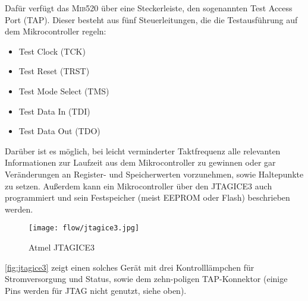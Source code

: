 Dafür verfügt das \textsc{Mib}520 über eine Steckerleiste, den sogenannten Test Access Port (TAP). Dieser besteht aus fünf Steuerleitungen, die die Testausführung auf dem Mikrocontroller regeln:
\begin{itemize}
\item Test Clock (TCK)
\item Test Reset (TRST)
\item Test Mode Select (TMS)
\item Test Data In (TDI)
\item Test Data Out (TDO)
\end{itemize}

Darüber ist es möglich, bei leicht verminderter Taktfrequenz alle relevanten Informationen zur Laufzeit aus dem Mikrocontroller zu gewinnen oder gar Veränderungen an Register- und Speicherwerten vorzunehmen, sowie Haltepunkte zu setzen. Außerdem kann ein Mikrocontroller über den JTAGICE3 auch programmiert und sein Festspeicher (meist EEPROM oder Flash) beschrieben werden.

\begin{figure}[!h]
  \centering
    \texttt{[image: flow/jtagice3.jpg]}
    \caption{Atmel JTAGICE3 \cite{AtmelJTAGICE3:2014:Online}}
    \label{fig:jtagice3}
\end{figure}

\autoref{fig:jtagice3} zeigt einen solches Gerät mit drei Kontrolllämpchen für Stromversorgung und Status, sowie dem zehn-poligen TAP-Konnektor (einige Pins werden für JTAG nicht genutzt, siehe oben).